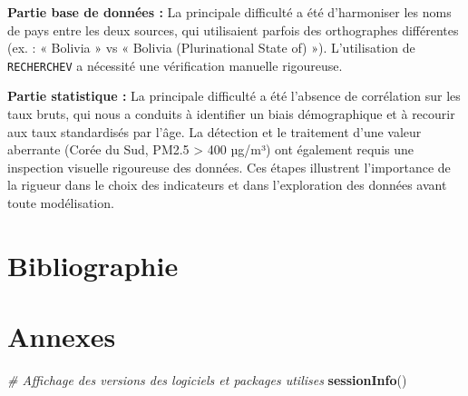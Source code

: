 \documentclass[mstat,12pt]{unswthesis}
\newenvironment{Shaded}{\begin{snugshade}}{\end{snugshade}}
\newcommand{\CommentTok}[1]{\textcolor[rgb]{0.56,0.35,0.01}{\textit{#1}}}
\newcommand{\FunctionTok}[1]{\textcolor[rgb]{0.13,0.29,0.53}{\textbf{#1}}}
\newcommand{\NormalTok}[1]{#1}
\begin{document}
\textbf{Partie base de données :} La principale difficulté a été
d'harmoniser les noms de pays entre les deux sources, qui utilisaient
parfois des orthographes différentes (ex. : « Bolivia » vs « Bolivia
(Plurinational State of) »). L'utilisation de \texttt{RECHERCHEV} a
nécessité une vérification manuelle rigoureuse.

\textbf{Partie statistique :} La principale difficulté a été l'absence
de corrélation sur les taux bruts, qui nous a conduits à identifier un
biais démographique et à recourir aux taux standardisés par l'âge. La
détection et le traitement d'une valeur aberrante (Corée du Sud, PM2.5
\textgreater{} 400 µg/m³) ont également requis une inspection visuelle
rigoureuse des données. Ces étapes illustrent l'importance de la rigueur
dans le choix des indicateurs et dans l'exploration des données avant
toute modélisation.

\chapter*{Bibliographie}\label{bibliographie}

\chapter*{Annexes}\label{annexes}

\begin{Shaded}
\begin{Highlighting}[]
\CommentTok{\# Affichage des versions des logiciels et packages utilises}
\FunctionTok{sessionInfo}\NormalTok{()}
\end{Highlighting}
\end{Shaded}
\end{document}
